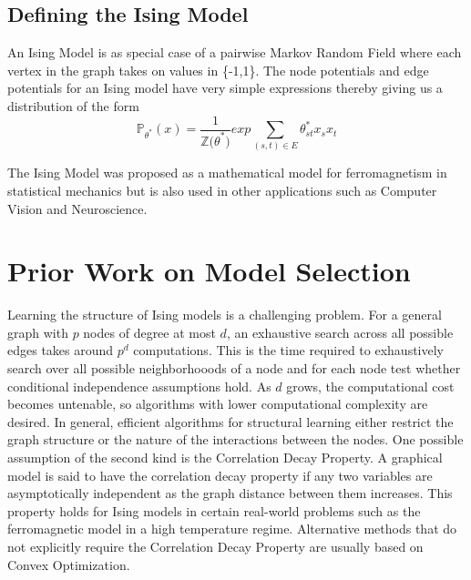 \documentclass[11pt]{article}
\begin{document}
\subsection{Defining the Ising Model}
An Ising Model is as special case of a pairwise Markov Random Field where each vertex in the graph takes on values in \{-1,1\}.
The node potentials and edge potentials for an Ising model have very simple expressions thereby giving us a distribution of the form
\[ \mathbb{P}_{\theta^*} (x)  =  \frac{1}{\mathbb{Z(\theta}^*)} exp { \sum\limits_{ (s,t) \in E} \theta^*_{st} x_s x_t  }   \]

The Ising Model was proposed as a mathematical model for ferromagnetism in statistical mechanics but is also used in other applications such as Computer Vision and Neuroscience.

	

\section{Prior Work on Model Selection}

Learning the structure of Ising models is a challenging problem. 
For a general graph with $p$ nodes of degree at most $ d $, an exhaustive search across all possible edges takes around $ p^d $ computations. 
This is the time required to exhaustively search over all possible neighborhooods of a node and for each node test whether conditional independence assumptions hold. 
As $ d $ grows, the computational cost becomes untenable, so algorithms with lower computational complexity are desired.
In general, efficient algorithms for structural learning either restrict the graph structure or the nature of the interactions between the nodes. 
One possible assumption of the second kind is the Correlation Decay Property. 
A graphical model is said to have the correlation decay property if any two variables are asymptotically independent as the graph distance between them increases. 
This property holds for Ising models in certain real-world problems such as the ferromagnetic model in a high temperature regime. 
Alternative methods that do not explicitly require the Correlation Decay Property are usually based on Convex Optimization. \\
\end{document}
